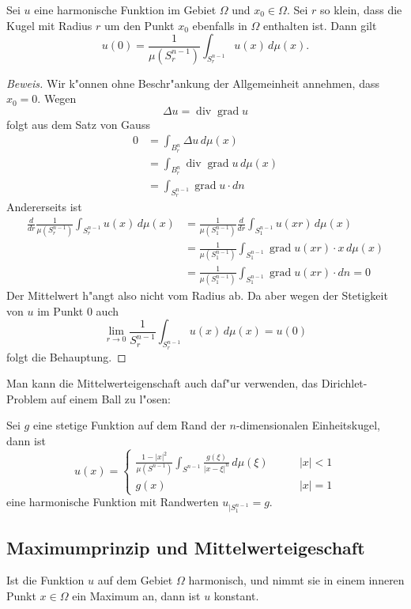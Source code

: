 \begin{satz}[Mittelwerteigenschaft]
Sei $u$ eine harmonische Funktion im Gebiet $\Omega$ und $x_0\in\Omega$.
Sei $r$ so klein, dass die Kugel mit Radius $r$ um den Punkt $x_0$
ebenfalls in $\Omega$ enthalten ist. Dann gilt
\[
u(0)=\frac1{\mu(S^{n-1}_r)}\int_{S^{n-1}_r}u(x)\,d\mu(x).
\]
\end{satz}
\begin{proof}[Beweis]
Wir k"onnen ohne Beschr"ankung der Allgemeinheit annehmen, dass $x_0=0$.
Wegen 
\[
\Delta u=\operatorname{div}\operatorname{grad}u
\]
folgt aus dem Satz von Gauss
\begin{align*}
0&=\int_{B_r^n}\Delta u\,d\mu(x)
\\
&=\int_{B_r^n}\operatorname{div}\operatorname{grad}u\,d\mu(x)
\\
&=\int_{S_r^{n-1}} \operatorname{grad}u\cdot dn
\end{align*}
Andererseits ist 
\begin{align*}
\frac{d}{dr}\frac{1}{\mu(S_r^{n-1})}\int_{S_r^{n-1}} u(x)\,d\mu(x)
&=
\frac1{\mu(S_1^{n-1})}\frac{d}{dr}\int_{S_1^{n-1}}u(xr)\,d\mu(x)
\\
&=
\frac1{\mu(S_1^{n-1})}\int_{S_1^{n-1}}\operatorname{grad}u(xr)\cdot x
\,d\mu(x)
\\
&=
\frac1{\mu(S_1^{n-1})}\int_{S_1^{n-1}}\operatorname{grad}u(xr)\cdot dn=0
\end{align*}
Der Mittelwert h"angt also nicht vom Radius ab. Da aber wegen
der Stetigkeit von $u$ im Punkt $0$ auch
\[
\lim_{r\to 0}\frac1{S_r^{n-1}}\int_{S_r^{n-1}}u(x)\,d\mu(x)=u(0)
\]
folgt die Behauptung.
\end{proof}

Man kann die Mittelwerteigenschaft auch daf"ur verwenden, das Dirichlet-Problem
auf einem Ball zu l"osen:

\begin{satz}
Sei $g$ eine stetige Funktion auf dem Rand der $n$-dimensio\-nalen
Einheitskugel, dann ist
\[
u(x)=\begin{cases}
\displaystyle \frac{1-|x|^2}{\mu(S^{n-1})}
\int_{S^{n-1}}\frac{g(\xi)}{|x-\xi|^n}\,d\mu(\xi)&\qquad |x|<1\\
g(x)&\qquad |x|=1
\end{cases}
\]
eine harmonische Funktion mit Randwerten $u_{|S_1^{n-1}}=g$.
\end{satz}

\subsection{Maximumprinzip und Mittelwerteigeschaft}
\begin{satz}[Maximumprinzip]Ist die Funktion $u$ auf dem Gebiet
$\Omega$ harmonisch, und nimmt sie in einem inneren Punkt $x\in\Omega$
ein Maximum an, dann ist $u$ konstant.
\end{satz}

